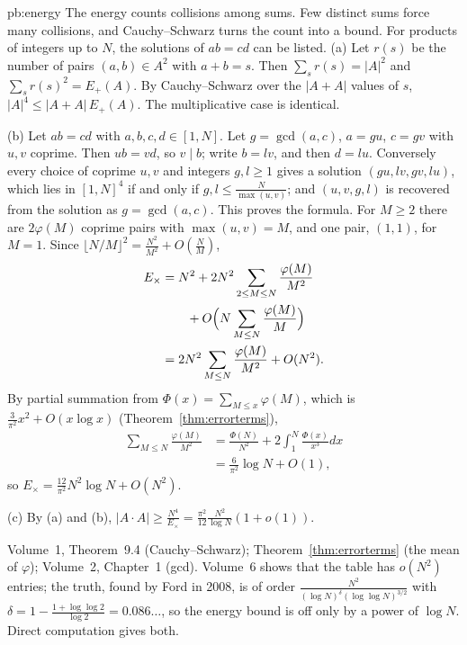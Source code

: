 \begin{solution}{pb:energy}
\idea The energy counts collisions among sums. Few distinct sums force many collisions, and Cauchy--Schwarz turns the count into a bound. For products of integers up to $N$, the solutions of $ab=cd$ can be listed.
\writeup (a) Let $r(s)$ be the number of pairs $(a,b)\in A^2$ with $a+b=s$. Then $\sum_sr(s)=|A|^2$ and $\sum_sr(s)^2=E_+(A)$. By
Cauchy--Schwarz over the $|A+A|$ values of $s$, $|A|^4\le|A+A|\,E_+(A)$. The multiplicative case is identical.

(b) Let $ab=cd$ with $a,b,c,d\in[1,N]$. Let $g=\gcd(a,c)$, $a=gu$, $c=gv$ with $u,v$ coprime. Then $ub=vd$, so $v\mid b$; write $b=lv$, and then
$d=lu$. Conversely every choice of coprime $u,v$ and integers $g,l\ge1$ gives a solution $(gu,lv,gv,lu)$, which lies in $[1,N]^4$ if and only
if $g,l\le\frac N{\max(u,v)}$; and $(u,v,g,l)$ is recovered from the solution as $g=\gcd(a,c)$. This proves the formula. For $M\ge2$ there
are $2\varphi(M)$ coprime pairs with $\max(u,v)=M$, and one pair, $(1,1)$, for $M=1$. Since $\lfloor N/M\rfloor^2=\frac{N^2}{M^2}+O(\frac NM)$,
\[
\begin{aligned}
E_\times&=N^2+2N^2\sum_{2\le M\le N}\frac{\varphi(M)}{M^2}\\
&\qquad+O\Bigl(N\sum_{M\le N}\frac{\varphi(M)}M\Bigr)\\
&=2N^2\sum_{M\le N}\frac{\varphi(M)}{M^2}+O(N^2).
\end{aligned}
\]
By partial summation from $\Phi(x)=\sum_{M\le x}\varphi(M)$, which is $\frac3{\pi^2}x^2+O(x\log x)$ (Theorem~\ref{thm:errorterms}),
\[
\begin{aligned}
\sum_{M\le N}\frac{\varphi(M)}{M^2}&=\frac{\Phi(N)}{N^2}+2\int_1^N\frac{\Phi(x)}{x^3}dx\\
&=\frac6{\pi^2}\log N+O(1),
\end{aligned}
\]
so $E_\times=\frac{12}{\pi^2}N^2\log N+O(N^2)$.

(c) By (a) and (b), $|A\cdot A|\ge\frac{N^4}{E_\times}=\frac{\pi^2}{12}\frac{N^2}{\log N}(1+o(1))$.

\tools Volume~1, Theorem~9.4 (Cauchy--Schwarz); Theorem~\ref{thm:errorterms} (the mean of $\varphi$); Volume~2, Chapter~1 (gcd).
\leads Volume~6 shows that the table has $o(N^2)$ entries; the truth, found by Ford in 2008, is of order
$\frac{N^2}{(\log N)^{\delta}(\log\log N)^{3/2}}$ with $\delta=1-\frac{1+\log\log2}{\log2}=0.086\ldots$, so the energy bound is off only by a power of
$\log N$. Direct computation gives both.
\end{solution}

